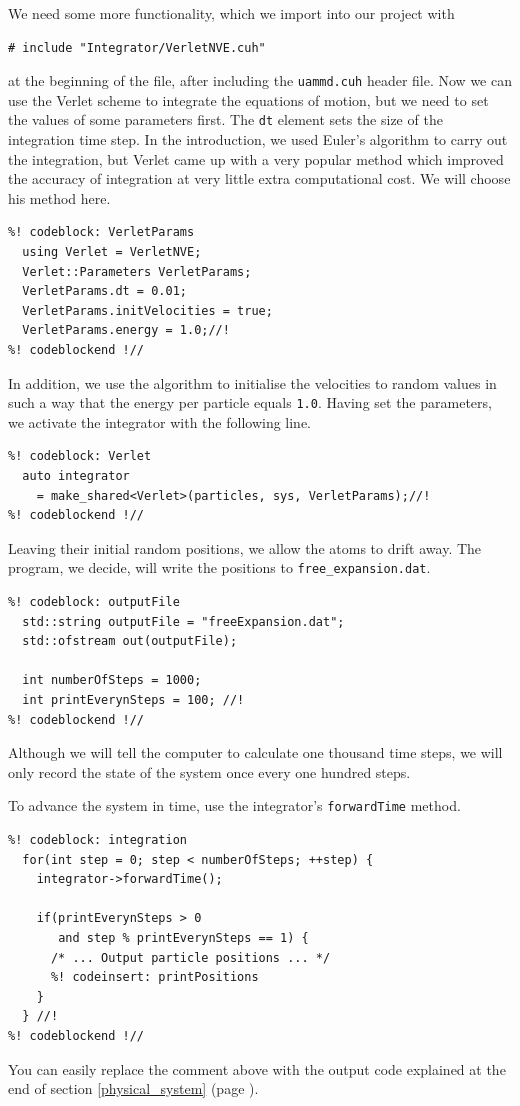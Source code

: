 We need some more functionality, which we import into our project with
\begin{lstlisting}
# include "Integrator/VerletNVE.cuh"
\end{lstlisting}
at the beginning of the file, after including the \texttt{uammd.cuh} header 
file. Now we can use the Verlet scheme to integrate the equations of motion, but 
we need to set the values of some parameters first. The \texttt{dt} element sets 
the size of the integration time step. In the introduction, we used Euler's 
algorithm to carry out the integration, but Verlet came up with a very popular 
method which improved the accuracy of integration at very little extra 
computational cost. We will choose his method here.
\begin{lstlisting}
%! codeblock: VerletParams
  using Verlet = VerletNVE;
  Verlet::Parameters VerletParams;
  VerletParams.dt = 0.01;
  VerletParams.initVelocities = true;
  VerletParams.energy = 1.0;//!
%! codeblockend !//
\end{lstlisting}
In addition, we use the algorithm to initialise the velocities to random values
in such a way that the energy per particle equals \texttt{1.0}. Having set the
parameters, we activate the integrator with the following line.
\begin{lstlisting}
%! codeblock: Verlet
  auto integrator
    = make_shared<Verlet>(particles, sys, VerletParams);//!
%! codeblockend !//
\end{lstlisting}

Leaving their initial random positions, we allow the atoms to drift away. The 
program, we decide, will write the positions to \texttt{free\_expansion.dat}.
\begin{lstlisting}
%! codeblock: outputFile
  std::string outputFile = "freeExpansion.dat";
  std::ofstream out(outputFile);

  int numberOfSteps = 1000;
  int printEverynSteps = 100; //!
%! codeblockend !//
\end{lstlisting}
Although we will tell the computer to calculate one thousand time steps, we
will only record the state of the system once every one hundred steps. 

To advance the system in time, use the integrator's \texttt{forwardTime} method.
\begin{lstlisting}
%! codeblock: integration
  for(int step = 0; step < numberOfSteps; ++step) {
    integrator->forwardTime();

    if(printEverynSteps > 0
       and step % printEverynSteps == 1) {
      /* ... Output particle positions ... */
      %! codeinsert: printPositions
    }
  } //!
%! codeblockend !//
\end{lstlisting}
You can easily replace the comment above with the output code explained at the
end of section \ref{physical_system} (page \pageref{particlePositions}).

